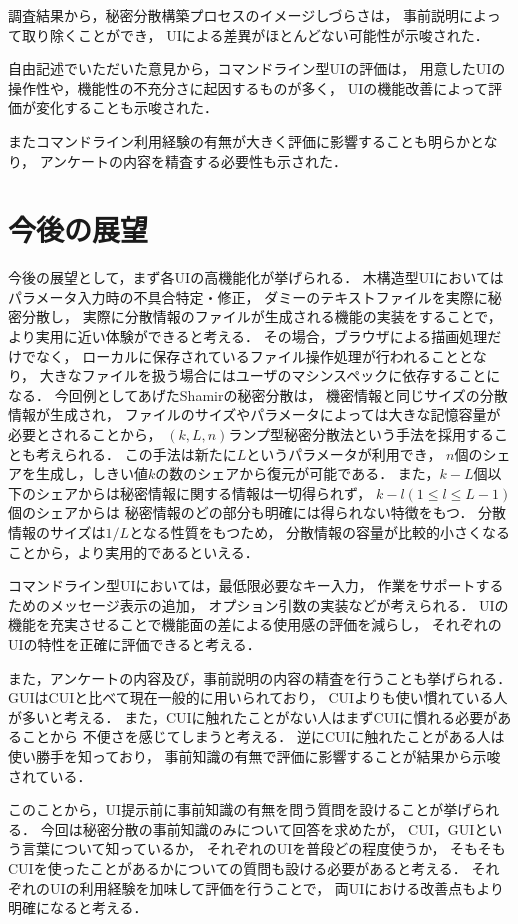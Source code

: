 \documentclass[twocolumn, fleqn, uplatex]{jsarticle}
\begin{document}
調査結果から，秘密分散構築プロセスのイメージしづらさは，%
事前説明によって取り除くことができ，%
UIによる差異がほとんどない可能性が示唆された．

自由記述でいただいた意見から，コマンドライン型UIの評価は，%
用意したUIの操作性や，機能性の不充分さに起因するものが多く，%
UIの機能改善によって評価が変化することも示唆された．

またコマンドライン利用経験の有無が大きく評価に影響することも明らかとなり，%
アンケートの内容を精査する必要性も示された．

\section{今後の展望}
今後の展望として，まず各UIの高機能化が挙げられる．%
木構造型UIにおいてはパラメータ入力時の不具合特定・修正，%
ダミーのテキストファイルを実際に秘密分散し，%
実際に分散情報のファイルが生成される機能の実装をすることで，%
より実用に近い体験ができると考える．%
その場合，ブラウザによる描画処理だけでなく，%
ローカルに保存されているファイル操作処理が行われることとなり，%
大きなファイルを扱う場合にはユーザのマシンスペックに依存することになる．%
今回例としてあげたShamirの秘密分散は，%
機密情報と同じサイズの分散情報が生成され，%
ファイルのサイズやパラメータによっては大きな記憶容量が必要とされることから，%
$(k, L, n)$ランプ型秘密分散法という手法を採用することも考えられる．%
この手法は新たに$L$というパラメータが利用でき，%
$n$個のシェアを生成し，しきい値$k$の数のシェアから復元が可能である．%
また，$k - L$個以下のシェアからは秘密情報に関する情報は一切得られず，%
$k - l(1{\leq}l{\leq}L-1)$個のシェアからは%
秘密情報のどの部分も明確には得られない特徴をもつ．%
分散情報のサイズは$1/L$となる性質をもつため，%
分散情報の容量が比較的小さくなることから，より実用的であるといえる．%

コマンドライン型UIにおいては，最低限必要なキー入力，%
作業をサポートするためのメッセージ表示の追加，%
オプション引数の実装などが考えられる．%
UIの機能を充実させることで機能面の差による使用感の評価を減らし，%
それぞれのUIの特性を正確に評価できると考える．

また，アンケートの内容及び，事前説明の内容の精査を行うことも挙げられる．%
GUIはCUIと比べて現在一般的に用いられており，%
CUIよりも使い慣れている人が多いと考える．%
また，CUIに触れたことがない人はまずCUIに慣れる必要があることから%
不便さを感じてしまうと考える．%
逆にCUIに触れたことがある人は使い勝手を知っており，%
事前知識の有無で評価に影響することが結果から示唆されている．

このことから，UI提示前に事前知識の有無を問う質問を設けることが挙げられる．%
今回は秘密分散の事前知識のみについて回答を求めたが，%
CUI，GUIという言葉について知っているか，%
それぞれのUIを普段どの程度使うか，%
そもそもCUIを使ったことがあるかについての質問も設ける必要があると考える．%
それぞれのUIの利用経験を加味して評価を行うことで，%
両UIにおける改善点もより明確になると考える．
\end{document}
